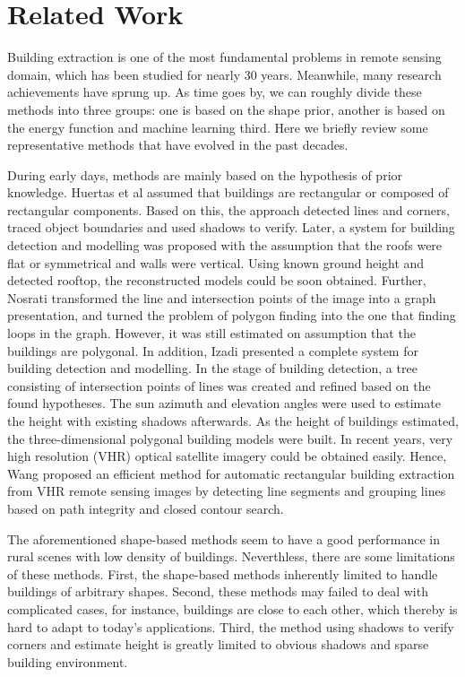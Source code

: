 \section{Related Work}
\label{Sec:RelatedWork}
Building extraction is one of the most fundamental problems in remote sensing domain, which has been studied for nearly 30 years. Meanwhile, many research achievements have sprung up. As time goes by, we can roughly divide these methods into three groups: one is based on the shape prior, another is based on the energy function and machine learning third. Here we briefly review some representative methods that have evolved in the past decades.\par
\setlength{\parindent}{2ex}During early days, methods are mainly based on the hypothesis of prior knowledge. Huertas et al \cite{IEEEexample:huertas1988detecting} assumed that buildings are rectangular or composed of rectangular components. Based on this, the approach detected lines and corners, traced object boundaries and used shadows to verify. Later, a system \cite{IEEEexample:noronha2001detection} for building detection and modelling was proposed with the assumption that the roofs were flat or symmetrical and walls were vertical. Using known ground height and detected rooftop, the reconstructed models could be soon obtained. Further, Nosrati \cite{IEEEexample:nosrati2009novel} transformed the line and intersection points of the image into a graph presentation, and turned the problem of polygon finding into the one that finding loops in the graph. However, it was still estimated on assumption that the buildings are polygonal. In addition, Izadi \cite{IEEEexample:izadi2012three} presented a complete system for building detection and modelling. In the stage of building detection, a tree consisting of intersection points of lines was created and refined based on the found hypotheses. The sun azimuth and elevation angles were used to estimate the height with existing shadows afterwards. As the height of buildings estimated, the three-dimensional polygonal building models were built. In recent years, very high resolution (VHR) optical satellite imagery could be obtained easily. Hence, Wang \cite{IEEEexample:wang2015efficient} proposed an efficient method for automatic rectangular building extraction from VHR remote sensing images by detecting line segments and grouping lines based on path integrity and closed contour search.\par
\setlength{\parindent}{2ex}The aforementioned shape-based methods seem to have a good performance in rural scenes with low density of buildings. Neverthless, there are some limitations of these methods. First, the shape-based methods inherently limited to handle buildings of arbitrary shapes. Second, these methods may failed to deal with complicated cases, for instance, buildings are close to each other, which thereby is hard to adapt to today's applications. Third, the method using shadows to verify corners and estimate height is greatly limited to obvious shadows and sparse building environment. \par

